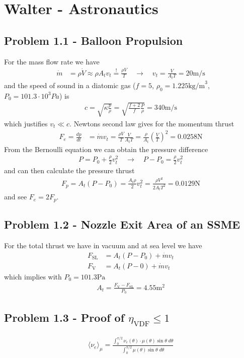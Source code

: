\documentclass[../main.tex]{subfiles}
\begin{document}
\section{{\sc Walter} - Astronautics}
\subsection{Problem 1.1 - Balloon Propulsion}
For the mass flow rate we have
\begin{align}
    \dot{m}&=\rho\dot{V}\approx\rho A_t v_t \stackrel{!}{=} \frac{\rho V}{T}\quad\rightarrow\quad v_t=\frac{V}{A_tT}=20\text{m/s}
\end{align}
and the speed of sound in a diatomic gas ($f=5$, $\rho_0=1.225\text{kg/m}^3$, $P_0=101.3\cdot10^3Pa$) is
\begin{align}
    c=\sqrt{\kappa\frac{p}{\rho}}=\sqrt{\frac{f+2}{f}\frac{P}{\rho}}=340\text{m/s}
\end{align}
which justifies $v_t\ll c$. Newtons second law gives for the momentum thrust
\begin{align}
    F_e=\frac{dp}{dt}&=\dot{m}v_t=\frac{\rho V}{T}\frac{V}{A_t T}=\frac{\rho}{A_t}\left(\frac{V}{T}\right)^2=0.0258\text{N}
\end{align}
From the Bernoulli equation we can obtain the pressure difference
\begin{align}
    P = P_0+\frac{\rho}{2}v_t^2\quad\rightarrow\quad P - P_0=\frac{\rho}{2}v_t^2
\end{align}
and can then calculate the pressure thrust
\begin{align}
    F_p=A_t(P-P_0)=\frac{A_t\rho}{2}v_t^2=\frac{\rho V^2}{2A_tT^2}=0.0129\text{N}
\end{align}
and see $F_e=2F_p$.


\subsection{Problem 1.2 - Nozzle Exit Area of an SSME}
For the total thrust we have in vacuum and at sea level we have
\begin{align}
    F_\text{SL}&=A_t(P-P_0) + \dot{m}v_t\\
    F_\text{V}&=A_t(P-0) + \dot{m}v_t
\end{align}
which implies with $P_0=101.3\text{Pa}$
\begin{align}
    A_t=\frac{F_\text{V}-F_\text{SL}}{P_0}=4.55\text{m}^2
\end{align}


\subsection{Problem 1.3 - Proof of \texorpdfstring{$\eta_\text{VDF}\le1$}{Lg} }
\begin{align}
    \langle \nu_e\rangle_\mu=\frac{\int_0^{\pi/2}\nu_e(\theta)\cdot\mu(\theta)\sin\theta\;d\theta}{\int_0^{\pi/2}\mu(\theta)\sin\theta\;d\theta}
\end{align}
\end{document}
